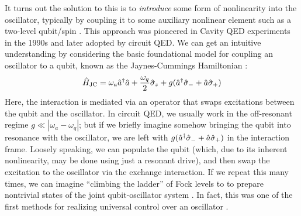 It turns out the solution to this is to \textit{introduce} some form of nonlinearity into the oscillator, typically by coupling it to some auxiliary nonlinear element such as a two-level qubit/spin \cite{cai2021bosonic, raimond2006exploring, haroche2020cavity, blais2021circuit}. This approach was pioneered in Cavity QED experiments in the 1990s and later adopted by circuit QED. We can get an intuitive understanding by considering the basic foundational model for coupling an oscillator to a qubit, known as the Jaynes-Cummings Hamiltonian \cite{raimond2006exploring}:
\begin{equation}
    \hat{H}_{\rm JC} = \omega_a \hat{a}^\dagger\hat{a} + \frac{\omega_q}{2}\hat{\sigma}_z + g(\hat{a}^\dagger\hat{\sigma}_- + \hat{a}\hat{\sigma}_+)
\end{equation}
Here, the interaction is mediated via an operator that swaps excitations between the qubit and the oscillator. In circuit QED, we usually work in the off-resonant regime $g \ll |\omega_a - \omega_q|$; but if we briefly imagine somehow bringing the qubit into resonance with the oscillator, we are left with $g(\hat{a}^\dagger\hat{\sigma}_- + \hat{a}\hat{\sigma}_+)$ in the interaction frame. Loosely speaking, we can populate the qubit (which, due to its inherent nonlinearity, may be done using just a resonant drive), and then swap the excitation to the oscillator via the exchange interaction. If we repeat this many times, we can imagine ``climbing the ladder'' of Fock levels to to prepare nontrivial states of the joint qubit-oscillator system \cite{krause1989preparation, meystre1990cat, vogel1993quantum}. In fact, this was one of the first methods for realizing universal control over an oscillator \cite{law1996arbitrary}. 

